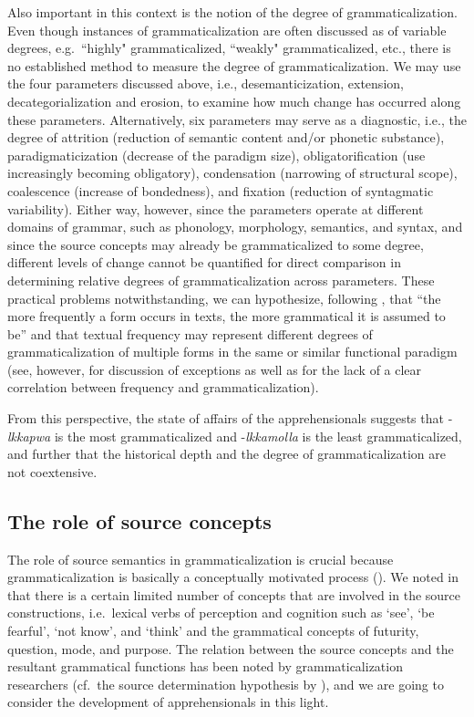\documentclass[output=paper,colorlinks,citecolor=brown]{langscibook}
\begin{document}
Also important in this context is the notion of the degree of grammaticalization. Even though instances of grammaticalization are often discussed as of variable degrees, e.g.\  ``highly" grammaticalized, ``weakly" grammaticalized, etc., there is no established method to measure the degree of grammaticalization. We may use the four parameters discussed above, i.e., desemanticization, extension, decategorialization and erosion, to examine how much change has occurred along these parameters. Alternatively,  six parameters may serve as a diagnostic, i.e., the degree of attrition (reduction of semantic content and/or phonetic substance), paradigmaticization (decrease of the paradigm size), obligatorification (use increasingly becoming obligatory), condensation (narrowing of structural scope), coalescence (increase of bondedness), and fixation (reduction of syntagmatic variability). Either way, however, since the parameters operate at different domains of grammar, such as phonology, morphology, semantics, and syntax, and since the source concepts may already be grammaticalized to some degree, different levels of change cannot be quantified for direct comparison in determining relative degrees of grammaticalization across parameters. These practical problems notwithstanding, we can hypothesize, following \citet[106]{HopperTraugott2003}, that ``the more frequently a form occurs in texts, the more grammatical it is assumed to be'' and that textual frequency may represent different degrees of grammaticalization of multiple forms in the same or similar functional paradigm (see, however, \citealt{Heine1992} for discussion of exceptions as well as \citealt[38--39]{HeineKuteva2007} for the lack of a clear correlation between frequency and grammaticalization).

From this perspective, the state of affairs of the  apprehensionals suggests that \nobreakdash-\textit{lkkapwa} is the most grammaticalized and \nobreakdash-\textit{lkkamolla} is the least grammaticalized, and further that the historical depth and the degree of grammaticalization are not coextensive.



\subsection{The role of source concepts}
\label{subsec:sourceconcepts}

The role of source semantics in grammaticalization is crucial because grammaticalization is basically a conceptually motivated process (\citealt{Heine1986,Heine1997,HeineClaudi1986,HeineEtAl1991,Kuteva2001}). We noted in  that there is a certain limited number of concepts that are involved in the source constructions, i.e.\  lexical verbs of perception and cognition such as `see', `be fearful', `not know', and `think' and the grammatical concepts of futurity, question, mode, and purpose. The relation between the source concepts and the resultant grammatical functions has been noted by grammaticalization researchers (cf.\ the source determination hypothesis by \citet{bybeeetal1994}), and we are going to consider the development of apprehensionals in this light.
\end{document}
